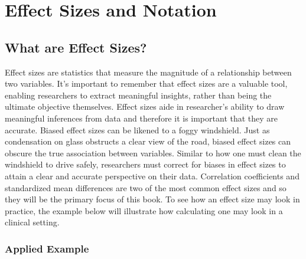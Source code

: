 \documentclass[
  letterpaper,
  DIV=11,
  numbers=noendperiod]{scrreprt}
\begin{document}

\hypertarget{effect-sizes-and-notation}{%
\chapter{Effect Sizes and Notation}\label{effect-sizes-and-notation}}

\hypertarget{what-are-effect-sizes}{%
\section{What are Effect Sizes?}\label{what-are-effect-sizes}}

Effect sizes are statistics that measure the magnitude of a relationship
between two variables. It's important to remember that effect sizes are
a valuable tool, enabling researchers to extract meaningful insights,
rather than being the ultimate objective themselves. Effect sizes aide
in researcher's ability to draw meaningful inferences from data and
therefore it is important that they are accurate. Biased effect sizes
can be likened to a foggy windshield. Just as condensation on glass
obstructs a clear view of the road, biased effect sizes can obscure the
true association between variables. Similar to how one must clean the
windshield to drive safely, researchers must correct for biases in
effect sizes to attain a clear and accurate perspective on their data.
Correlation coefficients and standardized mean differences are two of
the most common effect sizes and so they will be the primary focus of
this book. To see how an effect size may look in practice, the example
below will illustrate how calculating one may look in a clinical
setting.

\hypertarget{applied-example}{%
\subsection{Applied Example}\label{applied-example}}
\end{document}
